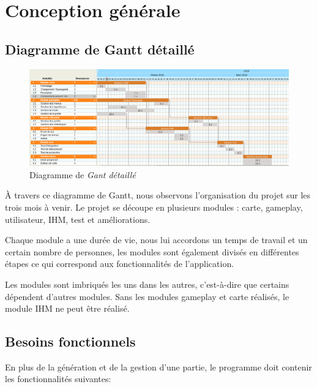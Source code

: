 \documentclass{report}
\begin{document}
		
\chapter{Conception générale}
\thispagestyle{empty}
\thispagestyle{plain}

    \section{Diagramme de Gantt détaillé}
    
    \begin{figure}[H]
	\caption{Diagramme de \textit{Gant détaillé}}
	\includegraphics[width=17cm]{ganttDetaille.png}
    \end{figure}
   
     À travers ce diagramme de Gantt, nous observons l'organisation du projet sur les trois mois à venir. Le projet se découpe en plusieurs modules : carte, gameplay, utilisateur, IHM, test et améliorations.
    
    Chaque module a une durée de vie, nous lui accordons un temps de travail et un certain nombre de personnes, les modules sont également divisés en différentes étapes ce qui correspond aux fonctionnalités de l'application. 
    
    Les modules sont imbriqués les uns dans les autres, c'est-à-dire que certains dépendent d'autres modules. Sans les modules gameplay et carte réalisés, le module IHM ne peut être réalisé. 
\newpage
   \section{Besoins fonctionnels}
   
    En plus de la génération et de la gestion d'une partie, le programme doit contenir les fonctionnalités suivantes:
\end{document}
